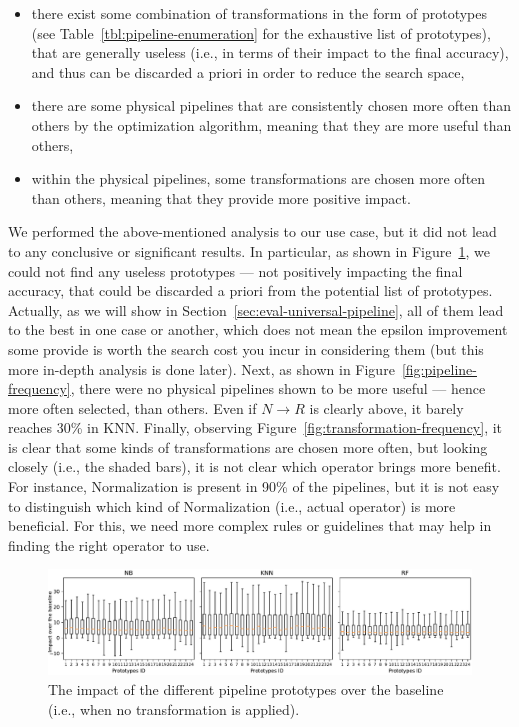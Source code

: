 \begin{itemize}
    \item there exist some combination of transformations in the form of prototypes (see Table~\ref{tbl:pipeline-enumeration} for the exhaustive list of prototypes), that are generally useless (i.e., in terms of their impact to the final accuracy), and thus can be discarded a priori in order to reduce the search space, 
    \item there are some physical pipelines that are consistently chosen more often than others by the optimization algorithm, meaning that they are more useful than others,
    \item within the physical pipelines, some transformations are chosen more often than others, meaning that they provide more positive impact. 
    \end{itemize}

\begin{example}
We performed the above-mentioned analysis to our use case, but it did not lead to any conclusive or significant results. In particular, as shown in Figure~\ref{fig:prototypes-impact}, we could not find any useless prototypes --- not positively impacting the final accuracy, that could be discarded a priori from the potential list of prototypes.
Actually, as we will show in Section~\ref{sec:eval-universal-pipeline}, all of them lead to the best in one case or another, which does not mean the epsilon improvement some provide is worth the search cost you incur in considering them (but this more in-depth analysis is done later).
Next, as shown in Figure~\ref{fig:pipeline-frequency}, there were no physical pipelines shown to be more useful --- hence more often selected, than others. Even if $N \rightarrow R$ is clearly above, it barely reaches 30\% in KNN.
 Finally, observing Figure~\ref{fig:transformation-frequency}, it is clear that some kinds of transformations are chosen more often, but looking closely (i.e., the shaded bars), it is not clear which operator brings more benefit. For instance, Normalization is present in 90\% of the pipelines, but it is not easy to distinguish which kind of Normalization (i.e., actual operator) is more beneficial.
For this, we need more complex rules or guidelines that may help in finding the right operator to use. 
\end{example}

\begin{figure}[!t]
	\centering
	\includegraphics[width=1.0\textwidth]{chapters/data-centric/supervised/img/prototypes_impact.pdf}
	\caption{The impact of the different pipeline prototypes over the baseline (i.e., when no transformation is applied).}
	\label{fig:prototypes-impact}
\end{figure}

